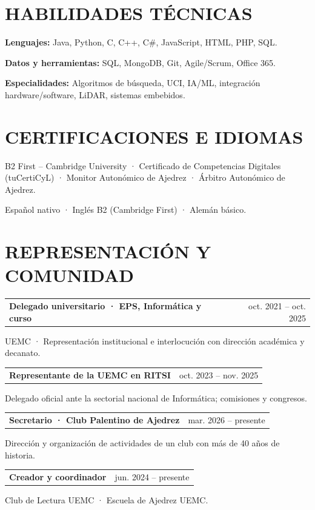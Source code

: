 \documentclass[10pt,a4paper]{article}
\makeatletter
\newcommand{\entry}[3]{\noindent\begin{tabularx}{\linewidth}{@{}Xr@{}}\textbf{#1}&{\small\color{muted}#2}\end{tabularx}\par{\small\color{muted}#3}\par}
\makeatother
\begin{document}
\section*{HABILIDADES TÉCNICAS}
\textbf{Lenguajes:} Java, Python, C, C++, C\#, JavaScript, HTML, PHP, SQL.\par
\textbf{Datos y herramientas:} SQL, MongoDB, Git, Agile/Scrum, Office 365.\par
\textbf{Especialidades:} Algoritmos de búsqueda, UCI, IA/ML, integración hardware/software, LiDAR, sistemas embebidos.\par
\section*{CERTIFICACIONES E IDIOMAS}
B2 First -- Cambridge University · Certificado de Competencias Digitales (tuCertiCyL) · Monitor Autonómico de Ajedrez · Árbitro Autonómico de Ajedrez.\par
Español nativo · Inglés B2 (Cambridge First) · Alemán básico.
\section*{REPRESENTACIÓN Y COMUNIDAD}
\entry{Delegado universitario · EPS, Informática y curso}{oct. 2021 -- oct. 2025}{UEMC · Representación institucional e interlocución con dirección académica y decanato.}\vspace{4pt}
\entry{Representante de la UEMC en RITSI}{oct. 2023 -- nov. 2025}{Delegado oficial ante la sectorial nacional de Informática; comisiones y congresos.}\vspace{4pt}
\entry{Secretario · Club Palentino de Ajedrez}{mar. 2026 -- presente}{Dirección y organización de actividades de un club con más de 40 años de historia.}\vspace{4pt}
\entry{Creador y coordinador}{jun. 2024 -- presente}{Club de Lectura UEMC · Escuela de Ajedrez UEMC.}\vspace{4pt}
\end{document}
